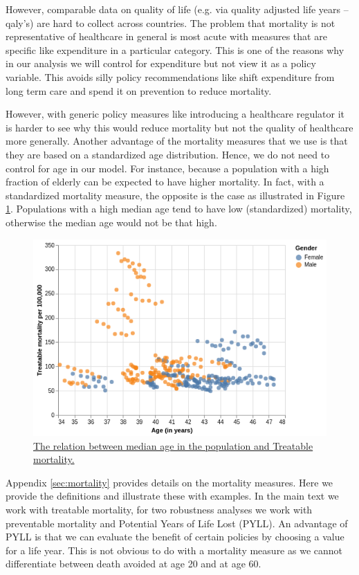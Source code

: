 \documentclass[12pt,english,a4paper]{article}
\begin{document}
However, comparable data on quality of life (e.g. via quality adjusted life years --qaly's) are hard to collect across countries. The problem that mortality is not representative of healthcare in general is most acute with measures that are specific like expenditure in a particular category. This is one of the reasons why in our analysis we will control for expenditure but not view it as a policy variable. This avoids silly policy recommendations like shift expenditure from long term care and spend it on prevention to reduce mortality.

However, with generic policy measures like introducing a healthcare regulator it is harder to see why this would reduce mortality but not the quality of healthcare more generally. Another advantage of the mortality measures that we use is that they are based on a standardized age distribution. Hence, we do not need to control for age in our model. For instance, because a population with a high fraction of elderly can be expected to have higher mortality. In fact, with a standardized mortality measure, the opposite is the case as illustrated in Figure \ref{fig:orge07ca72}. Populations with a high median age tend to have low (standardized) mortality, otherwise the median age would not be that high.

\begin{figure}[htbp]
\centering
\includegraphics[width=.9\linewidth]{./figures/age_mortality.png}
\caption{\label{fig:orge07ca72}\href{https://janboone.github.io/European-Healthcare-Systems/figures/age\_mortality.html}{The relation between median age in the population and Treatable mortality.}}
\end{figure}

Appendix \ref{sec:mortality} provides details on the mortality measures. Here we provide the definitions and illustrate these with examples. In the main text we work with treatable mortality, for two robustness analyses we work with preventable mortality and Potential Years of Life Lost (PYLL). An advantage of PYLL is that we can evaluate the benefit of certain policies by choosing a value for a life year. This is not obvious to do with a mortality measure as we cannot differentiate between death avoided at age 20 and at age 60.
\end{document}

